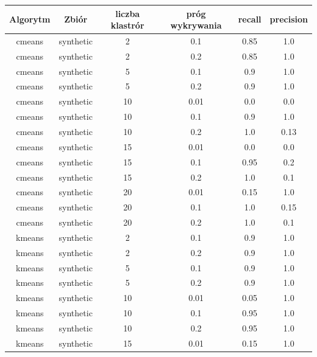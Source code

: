 \documentclass{classrep}
\begin{document}
{{            \begin{table}[!htbp]
                \footnotesize
                \centering
                \begin{tabular}{|c|c|c|c|c|c|}
                    \hline
                    Algorytm & Zbiór & liczba klastrór & próg wykrywania & recall & precision \\ \hline
                    cmeans & synthetic & 2 & 0.1 & 0.85 & 1.0 \\
                    cmeans & synthetic & 2 & 0.2 & 0.85 & 1.0 \\
                    cmeans & synthetic & 5 & 0.1 & 0.9 & 1.0 \\
                    cmeans & synthetic & 5 & 0.2 & 0.9 & 1.0 \\
                    cmeans & synthetic & 10 & 0.01 & 0.0 & 0.0 \\
                    cmeans & synthetic & 10 & 0.1 & 0.9 & 1.0 \\
                    cmeans & synthetic & 10 & 0.2 & 1.0 & 0.13 \\
                    cmeans & synthetic & 15 & 0.01 & 0.0 & 0.0 \\
                    cmeans & synthetic & 15 & 0.1 & 0.95 & 0.2 \\
                    cmeans & synthetic & 15 & 0.2 & 1.0 & 0.1 \\
                    cmeans & synthetic & 20 & 0.01 & 0.15 & 1.0 \\
                    cmeans & synthetic & 20 & 0.1 & 1.0 & 0.15 \\
                    cmeans & synthetic & 20 & 0.2 & 1.0 & 0.1 \\ \hline
                    kmeans & synthetic & 2 & 0.1 & 0.9 & 1.0 \\
                    kmeans & synthetic & 2 & 0.2 & 0.9 & 1.0 \\
                    kmeans & synthetic & 5 & 0.1 & 0.9 & 1.0 \\
                    kmeans & synthetic & 5 & 0.2 & 0.9 & 1.0 \\
                    kmeans & synthetic & 10 & 0.01 & 0.05 & 1.0 \\
                    kmeans & synthetic & 10 & 0.1 & 0.95 & 1.0 \\
                    kmeans & synthetic & 10 & 0.2 & 0.95 & 1.0 \\
                    kmeans & synthetic & 15 & 0.01 & 0.15 & 1.0 \\

\end{tabular}
\end{table}}}
\end{document}
